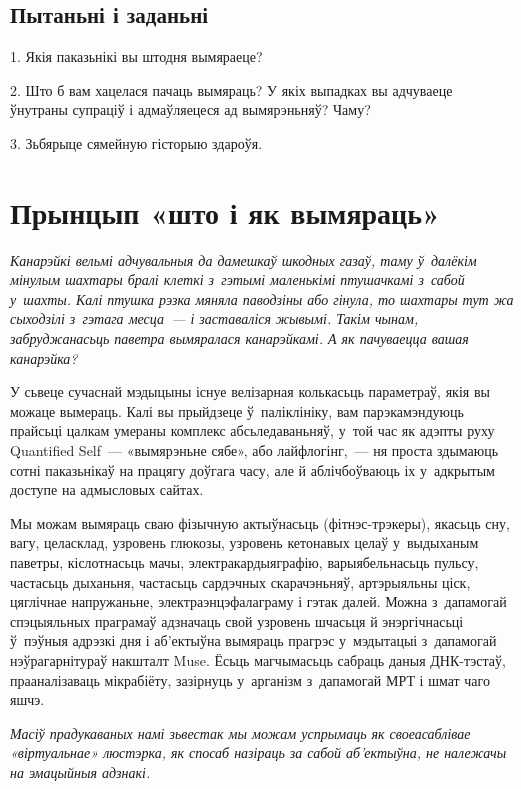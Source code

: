 \subsection*{Пытаньні і заданьні}

1. Якія паказьнікі вы штодня вымяраеце?

2. Што б вам хацелася пачаць вымяраць? У якіх выпадках вы адчуваеце ўнутраны супраціў і адмаўляецеся ад вымярэньняў? Чаму?

3. Зьбярыце сямейную гісторыю здароўя.


\section{Прынцып «што і як вымяраць»}

\emph{Канарэйкі вельмі адчувальныя да дамешкаў шкодных газаў, таму ў~далёкім мінулым шахтары бралі клеткі з~гэтымі маленькімі птушачкамі з~сабой у~шахты. Калі птушка рэзка мяняла паводзіны або гінула, то шахтары тут жа сыходзілі з~гэтага месца~--- і заставаліся жывымі. Такім чынам, забруджанасьць паветра вымяралася канарэйкамі. А як пачуваецца вашая канарэйка?}

У сьвеце сучаснай мэдыцыны існуе велізарная колькасьць параметраў, якія вы можаце вымераць. Калі вы прыйдзеце ў~паліклініку, вам парэкамэндуюць прайсьці цалкам умераны комплекс абсьледаваньняў, у~той час як адэпты руху Quantified Self~--- «вымярэньне сябе», або лайфлогінг,~--- ня проста здымаюць сотні паказьнікаў на працягу доўгага часу, але й аблічбоўваюць іх у~адкрытым доступе на адмысловых сайтах.

Мы можам вымяраць сваю фізычную актыўнасьць (фітнэс-трэкеры), якасьць сну, вагу, целасклад, узровень глюкозы, узровень кетонавых целаў у~выдыханым паветры, кіслотнасьць мачы, электракардыяграфію, варыябельнасьць пульсу, частасьць дыханьня, частасьць сардэчных скарачэньняў, артэрыяльны ціск, цяглічнае напружаньне, электраэнцэфалаграму і гэтак далей. Можна з~дапамогай спэцыяльных праграмаў адзначаць свой узровень шчасьця й энэргічнасьці ў~пэўныя адрэзкі дня і аб'ектыўна вымяраць прагрэс у~мэдытацыі з~дапамогай нэўрагарнітураў накшталт Muse. Ёсьць магчымасьць сабраць даныя ДНК-тэстаў, прааналізаваць мікрабіёту, зазірнуць у~арганізм з~дапамогай МРТ і шмат чаго яшчэ.


\emph{Масіў прадукаваных намі зьвестак мы можам успрымаць як своеасаблівае «віртуальнае» люстэрка, як спосаб назіраць за сабой аб'ектыўна, не належачы на эмацыйныя адзнакі.}

